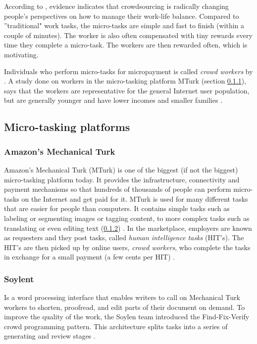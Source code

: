 According to \cite{Deng2016a}, evidence indicates that crowdsourcing is radically changing people's perspectives on how to manage their work-life balance. Compared to ''traditional" work tasks, the micro-tasks are simple and fast to finish (within a couple of minutes). The worker is also often compensated with tiny rewards every time they complete a micro-task. The workers are then rewarded often, which is motivating. 

Individuals who perform micro-tasks for micropayment is called \textit{crowd workers} by \citep{Deng2016a}. A study done on workers in the micro-tasking platform MTurk (section \ref{sec:mturk}), says that the workers are representative for the general Internet user population, but are generally younger and have lower incomes and smaller families \citep{Ipeirotis2010}.  

\subsection{Micro-tasking platforms}
\subsubsection[MTurk]{Amazon's Mechanical Turk}\label{sec:mturk}
Amazon's Mechanical Turk (MTurk) is one of the biggest (if not the biggest) micro-tasking platform today. It provides the infrastructure, connectivity and payment mechanisms so that hundreds of thousands of people can perform micro-tasks on the Internet and get paid for it. MTurk is used for many different tasks that are easier for people than computers. It contains simple tasks such as labeling or segmenting images or tagging content, to more complex tasks such as translating or even editing text (\ref{sec:soylent}) \citep{Franklin2011}.  In the marketplace, employers are known as requesters and they post tasks, called \textit{human intelligence tasks} (HIT's). The HIT's are then picked up by online users, \textit{crowd workers}, who complete the tasks in exchange for a small payment (a few cents per HIT) \citep{Ipeirotis2010}. 

\subsubsection{Soylent}\label{sec:soylent}
Is a word processing interface that enables writers to call on Mechanical Turk workers to shorten, proofread, and edit parts of their document on demand. To improve the quality of the work, the Soylen team introduced the Find-Fix-Verify crowd programming pattern. This architecture splits tasks into a series of generating and review stages \citep{Bernstein2015a}. 

